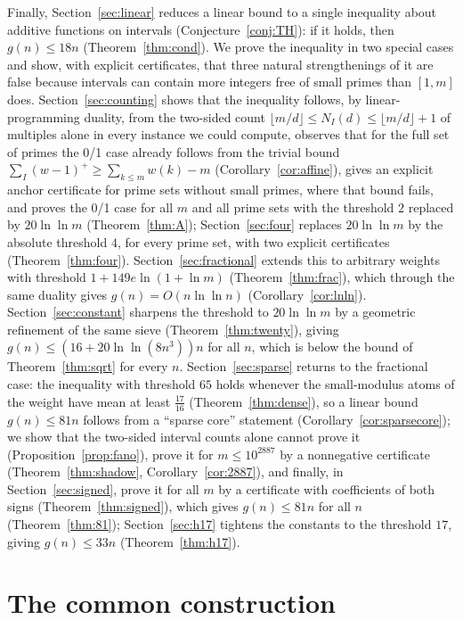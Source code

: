 \documentclass[11pt]{article}
\theoremstyle{definition}
\begin{document}
Finally, Section~\ref{sec:linear} reduces a linear bound to a single inequality about additive functions on
intervals (Conjecture~\ref{conj:TH}): if it holds, then $g(n)\le18n$ (Theorem~\ref{thm:cond}). We prove the
inequality in two special cases and show, with explicit certificates, that three natural strengthenings of it are
false because intervals can contain more integers free of small primes than $[1,m]$ does. Section~\ref{sec:counting} shows that the inequality follows, by linear-programming duality, from
the two-sided count $\lfloor m/d\rfloor\le N_I(d)\le\lfloor m/d\rfloor+1$ of multiples alone in every instance we could compute,
observes that for the full set of primes the 0/1 case already follows from the trivial bound
$\sum_I(w-1)^+\ge\sum_{k\le m}w(k)-m$ (Corollary~\ref{cor:affine}), gives an explicit anchor certificate for prime sets without small
primes, where that bound fails, and proves the 0/1 case for all $m$ and all prime sets with the threshold $2$ replaced by $20\ln\ln m$
(Theorem~\ref{thm:A}); Section~\ref{sec:four} replaces $20\ln\ln m$ by the absolute threshold $4$, for every prime set, with two
explicit certificates (Theorem~\ref{thm:four}). Section~\ref{sec:fractional} extends this to arbitrary weights
with threshold $1+149e\ln(1+\ln m)$ (Theorem~\ref{thm:frac}), which through the same duality gives
$g(n)=O(n\ln\ln n)$ (Corollary~\ref{cor:lnln}). Section~\ref{sec:constant} sharpens the threshold to $20\ln\ln m$ by a geometric
refinement of the same sieve (Theorem~\ref{thm:twenty}), giving $g(n)\le(16+20\ln\ln(8n^3))n$ for all $n$, which is below the
bound of Theorem~\ref{thm:sqrt} for every $n$. Section~\ref{sec:sparse} returns to the fractional case: the inequality with threshold $65$
holds whenever the small-modulus atoms of the weight have mean at least $\tfrac{17}{16}$ (Theorem~\ref{thm:dense}), so a linear bound
$g(n)\le81n$ follows from a ``sparse core'' statement (Corollary~\ref{cor:sparsecore}); we show that the two-sided interval counts alone
cannot prove it (Proposition~\ref{prop:fano}), prove it for $m\le10^{2887}$ by a nonnegative certificate (Theorem~\ref{thm:shadow},
Corollary~\ref{cor:2887}), and finally, in Section~\ref{sec:signed}, prove it for all $m$ by a certificate with coefficients of both signs
(Theorem~\ref{thm:signed}), which gives $g(n)\le81n$ for all $n$ (Theorem~\ref{thm:81}); Section~\ref{sec:h17} tightens the
constants to the threshold $17$, giving $g(n)\le33n$ (Theorem~\ref{thm:h17}).

\section{The common construction}\label{sec:construction}
\end{document}
